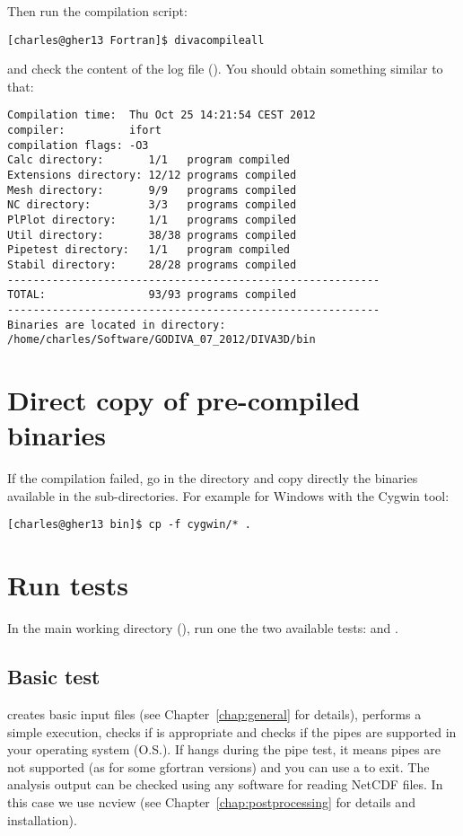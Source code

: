 Then run the compilation script: 
\begin{lstlisting}[style=Bash]
[charles@gher13 Fortran]$ divacompileall
\end{lstlisting}
and check the content of the log file (). You should obtain something similar to that:
\begin{verbatim}
Compilation time:  Thu Oct 25 14:21:54 CEST 2012
compiler:          ifort
compilation flags: -O3
Calc directory:       1/1   program compiled
Extensions directory: 12/12 programs compiled
Mesh directory:       9/9   programs compiled
NC directory:         3/3   programs compiled
PlPlot directory:     1/1   programs compiled
Util directory:       38/38 programs compiled
Pipetest directory:   1/1   program compiled
Stabil directory:     28/28 programs compiled
----------------------------------------------------------
TOTAL:                93/93 programs compiled
----------------------------------------------------------
Binaries are located in directory:
/home/charles/Software/GODIVA_07_2012/DIVA3D/bin
\end{verbatim}

\section{Direct copy of pre-compiled binaries}

If the compilation failed, go in the  directory and copy directly the binaries available in the sub-directories. For example for Windows with the Cygwin tool:
\begin{lstlisting}[style=Bash]
[charles@gher13 bin]$ cp -f cygwin/* .
\end{lstlisting}

\section{Run tests\label{sec:divatest}}

In the main working directory (), run one the two available tests:  and . 


\subsection{Basic test}

 creates basic input files (see Chapter~\ref{chap:general} for details), performs a simple \diva execution, checks if  is appropriate and checks if the pipes are supported in your operating system (O.S.). If  hangs during the pipe test, it means pipes are not supported (as for some gfortran versions) and you can use a  to exit.  The analysis output can be checked using any software for reading NetCDF files. In this case we use ncview (see Chapter~\ref{chap:postprocessing} for details and installation). 

